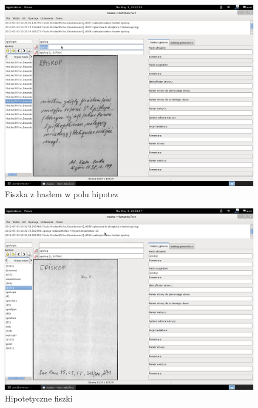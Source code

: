\documentclass[12pt,oneside,notitlepage,titleauthor]{mwart}%
\begin{document}
\begin{figure}[h]
\includegraphics[scale=0.3]{11episkop_zpodpowiedzi.png}
\caption{Fiszka z hasłem w polu hipotez}
\end{figure}

\begin{figure}[h]
\includegraphics[scale=0.3]{12episkop_hipotetycznefiszki.png}
\caption{Hipotetyczne fiszki}
\label{hipotetyczne}
\end{figure}


%
%
%
%
\end{document}
